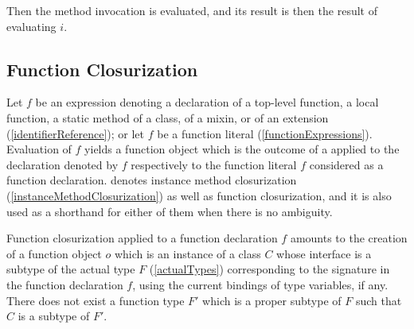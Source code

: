 \documentclass[makeidx]{article}
\begin{document}
{\LMHash{}%
Then the method invocation  is evaluated,
and its result is then the result of evaluating $i$.



\subsection{Function Closurization}

\LMHash{}%
Let $f$ be an expression denoting
a declaration of a top-level function, a local function,
a static method of a class, of a mixin, or of an extension
(\ref{identifierReference});
or let $f$ be a function literal
(\ref{functionExpressions}).
Evaluation of $f$ yields a function object
which is the outcome of a 
applied to the declaration denoted by $f$
respectively to the function literal $f$ considered as a function declaration.
denotes instance method closurization
(\ref{instanceMethodClosurization})
as well as function closurization,
and it is also used as a shorthand for either of them
when there is no ambiguity.

\LMHash{}%
Function closurization applied to a function declaration $f$
amounts to the creation of a function object $o$
which is an instance of a class $C$ whose interface is
a subtype of the actual type $F$
(\ref{actualTypes})
corresponding to the signature in the function declaration $f$,
using the current bindings of type variables, if any.
There does not exist a function type $F'$ which is a proper subtype of $F$
such that $C$ is a subtype of $F'$.



}
\end{document}

